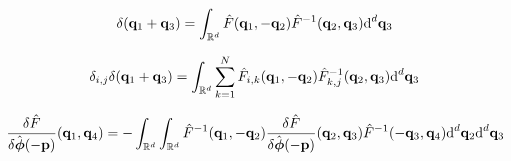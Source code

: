 \documentclass[10pt]{article}
\begin{document}
\begin{equation}
   \delta({\bf q}_1 +{\bf q}_3) = \int_{\mathbb{R}^d} \hat{F}({\bf q}_1, -{\bf q}_2) \hat{F}^{-1}({\bf q}_2, {\bf q}_3) \text{d}^d {\bf q}_3
\end{equation}


\begin{equation}
   \delta_{i,j}\delta({\bf q}_1 +{\bf q}_3) = \int_{\mathbb{R}^d} \sum_{k=1}^{N} \hat{F}_{i,k}({\bf q}_1, -{\bf q}_2) \hat{F}^{-1}_{k,j}({\bf q}_2, {\bf q}_3) \text{d}^d {\bf q}_3
\end{equation}

\begin{equation}
   \frac{\delta \hat{F}}{\delta \hat{\boldsymbol{ \phi}}(-{\bf p})}({\bf q}_1, {\bf q}_4) = - \int_{\mathbb{R}^d} \int_{\mathbb{R}^d} \hat{F}^{-1}({\bf q}_1, -{\bf q}_2) \frac{\delta \hat{F}}{\delta \hat{\boldsymbol{ \phi}}(-{\bf p})}({\bf q}_2, {\bf q}_3) \hat{F}^{-1}(-{\bf q}_3, {\bf q}_4) \text{d}^d {\bf q}_2 \text{d}^d {\bf q}_3
\end{equation}
\end{document}
